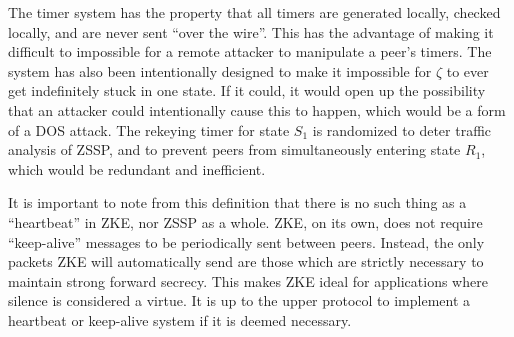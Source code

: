 \documentclass{article}
\begin{document}
\begin{definition}
\begin{itemize}
	\end{itemize}
	The timer system has the property that all timers are generated locally, checked locally, and are never sent ``over the wire''. This has the advantage of making it difficult to impossible for a remote attacker to manipulate a peer's timers. The system has also been intentionally designed to make it impossible for $\zeta$ to ever get indefinitely stuck in one state. If it could, it would open up the possibility that an attacker could intentionally cause this to happen, which would be a form of a DOS attack. The rekeying timer for state $S_1$ is randomized to  deter traffic analysis of ZSSP, and to prevent peers from simultaneously entering state $R_1$, which would be redundant and inefficient.

	It is important to note from this definition that there is no such thing as a ``heartbeat'' in ZKE, nor ZSSP as a whole. ZKE, on its own, does not require ``keep-alive'' messages to be periodically sent between peers. Instead, the only packets ZKE will automatically send are those which are strictly necessary to maintain strong forward secrecy. This makes ZKE ideal for applications where silence is considered a virtue. It is up to the upper protocol to implement a heartbeat or keep-alive system if it is deemed necessary.


\end{definition}
\end{document}

